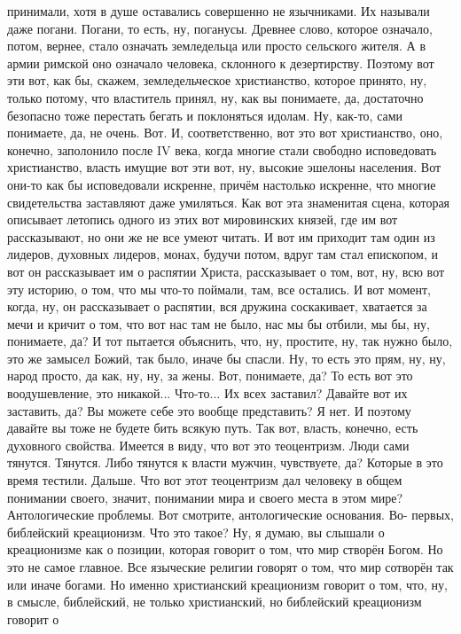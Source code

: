 принимали, хотя в душе оставались совершенно не язычниками. Их называли даже
погани. Погани, то есть, ну, поганусы. Древнее слово, которое означало, потом,
вернее, стало означать земледельца или просто сельского жителя. А в армии
римской оно означало человека, склонного к дезертирству. Поэтому вот эти вот,
как бы, скажем, земледельческое христианство, которое принято, ну, только
потому, что властитель принял, ну, как вы понимаете, да, достаточно безопасно
тоже перестать бегать и поклоняться идолам. Ну, как-то, сами понимаете, да, не
очень. Вот. И, соответственно, вот это вот христианство, оно, конечно,
заполонило после IV века, когда многие стали свободно исповедовать христианство,
власть имущие вот эти вот, ну, высокие эшелоны населения. Вот они-то как бы
исповедовали искренне, причём настолько искренне, что многие свидетельства
заставляют даже умиляться. Как вот эта знаменитая сцена, которая описывает
летопись одного из этих вот мировинских князей, где им вот рассказывают, но они
же не все умеют читать. И вот им приходит там один из лидеров, духовных лидеров,
монах, будучи потом, вдруг там стал епископом, и вот он рассказывает им о
распятии Христа, рассказывает о том, вот, ну, всю вот эту историю, о том, что мы
что-то поймали, там, все остались. И вот момент, когда, ну, он рассказывает о
распятии, вся дружина соскакивает, хватается за мечи и кричит о том, что вот нас
там не было, нас мы бы отбили, мы бы, ну, понимаете, да? И тот пытается
объяснить, что, ну, простите, ну, так нужно было, это же замысел Божий, так
было, иначе бы спасли. Ну, то есть это прям, ну, ну, народ просто, да как, ну,
ну, за жены. Вот, понимаете, да? То есть вот это воодушевление, это никакой...
Что-то... Их всех заставил? Давайте вот их заставить, да? Вы можете себе это
вообще представить? Я нет. И поэтому давайте вы тоже не будете бить всякую путь.
Так вот, власть, конечно, есть духовного свойства. Имеется в виду, что вот это
теоцентризм. Люди сами тянутся. Тянутся. Либо тянутся к власти мужчин,
чувствуете, да? Которые в это время тестили. Дальше. Что вот этот теоцентризм
дал человеку в общем понимании своего, значит, понимании мира и своего места в
этом мире? Антологические проблемы. Вот смотрите, антологические основания. Во-
первых, библейский креационизм. Что это такое? Ну, я думаю, вы слышали о
креационизме как о позиции, которая говорит о том, что мир створён Богом. Но это
не самое главное. Все языческие религии говорят о том, что мир сотворён так или
иначе богами. Но именно христианский креационизм говорит о том, что, ну, в
смысле, библейский, не только христианский, но библейский креационизм говорит о
